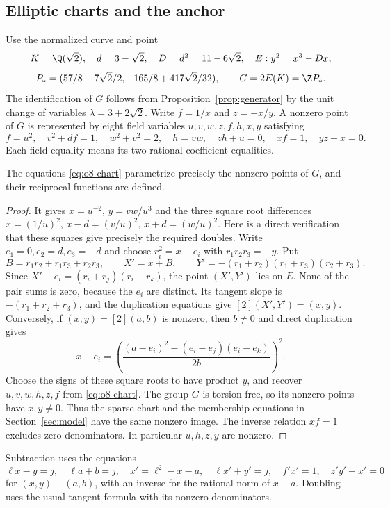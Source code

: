 \subsection{Elliptic charts and the anchor}

Use the normalized curve and point
\[
 K=\Q(\sqrt2),\quad d=3-\sqrt2,\quad D=d^2=11-6\sqrt2,
 \quad E:y^2=x^3-Dx,
\]
\[
 P_*=(57/8-7\sqrt2/2,-165/8+417\sqrt2/32),
 \qquad G=2E(K)=\Z P_*.
\]
The identification of $G$ follows from Proposition~\ref{prop:generator}
by the unit change of variables $\lambda=3+2\sqrt2$.
Write $f=1/x$ and $z=-x/y$. A nonzero point of $G$ is represented by
eight field variables $u,v,w,z,f,h,x,y$ satisfying
\begin{equation}\label{eq:o8-chart}
 f=u^2,\quad v^2+df=1,\quad w^2+v^2=2,\quad h=vw,
 \quad zh+u=0,\quad xf=1,\quad yz+x=0.
\end{equation}
Each field equality means its two rational coefficient equalities.
\begin{lemma}\label{lem:o8-chart}
The equations \eqref{eq:o8-chart} parametrize precisely the nonzero points
of $G$, and their reciprocal functions are defined.
\end{lemma}
\begin{proof}
It gives $x=u^{-2}$, $y=vw/u^3$ and the three square root differences
$x=(1/u)^2$, $x-d=(v/u)^2$, $x+d=(w/u)^2$.
Here is a direct verification that these squares give precisely the
required doubles. Write $e_1=0,e_2=d,e_3=-d$ and choose
$r_i^2=x-e_i$ with $r_1r_2r_3=-y$. Put
\[
 B=r_1r_2+r_1r_3+r_2r_3,\qquad
 X'=x+B,\qquad
 Y'=-(r_1+r_2)(r_1+r_3)(r_2+r_3).
\]
Since $X'-e_i=(r_i+r_j)(r_i+r_k)$, the point $(X',Y')$ lies on
$E$. None of the pair sums is zero, because the $e_i$ are distinct.
Its tangent slope is $-(r_1+r_2+r_3)$, and the duplication equations
give $[2](X',Y')=(x,y)$.
Conversely, if $(x,y)=[2](a,b)$ is nonzero, then $b\ne0$ and direct
duplication gives
\[
 x-e_i=\left(
 \frac{(a-e_i)^2-(e_i-e_j)(e_i-e_k)}{2b}\right)^2.
\]
Choose the signs of these square roots to have product $y$, and recover
$u,v,w,h,z,f$ from \eqref{eq:o8-chart}. The group $G$ is torsion-free, so its nonzero points have
$x,y\ne0$. Thus the sparse chart and the membership equations in
Section~\ref{sec:model} have the same nonzero image.
The inverse relation $xf=1$ excludes zero denominators. In particular
$u,h,z,y$ are nonzero.
\end{proof}

Subtraction uses the equations
\[
 \ell x-y=j,\quad \ell a+b=j,\quad
 x'=\ell^2-x-a,\quad \ell x'+y'=j,\quad
 f'x'=1,\quad z'y'+x'=0
\]
for $(x,y)-(a,b)$, with an inverse for the rational norm of $x-a$.
Doubling uses the usual tangent formula with its nonzero denominators.

